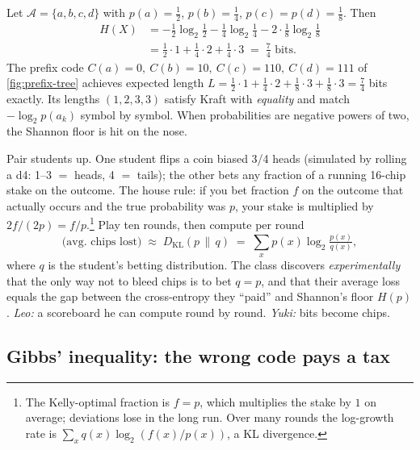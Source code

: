 \begin{example}
\label{ex:h4}
Let $\mathcal{A} = \{a, b, c, d\}$ with $p(a) = \tfrac{1}{2}$,
$p(b) = \tfrac{1}{4}$, $p(c) = p(d) = \tfrac{1}{8}$. Then
\begin{align*}
  H(X) &= -\tfrac{1}{2}\log_2\tfrac{1}{2}
         - \tfrac{1}{4}\log_2\tfrac{1}{4}
         - 2\cdot\tfrac{1}{8}\log_2\tfrac{1}{8} \\
       &= \tfrac{1}{2}\cdot 1 + \tfrac{1}{4}\cdot 2 + \tfrac{1}{4}\cdot 3
        \;=\; \tfrac{7}{4} \text{ bits}.
\end{align*}
The prefix code $C(a) = 0,\ C(b) = 10,\ C(c) = 110,\ C(d) = 111$ of
\cref{fig:prefix-tree} achieves expected length
$L = \tfrac12\cdot 1 + \tfrac14\cdot 2 + \tfrac18\cdot 3 + \tfrac18\cdot 3
= \tfrac74$ bits exactly. Its lengths $(1,2,3,3)$ satisfy Kraft with
\emph{equality} and match $-\log_2 p(a_k)$ symbol by symbol. When
probabilities are negative powers of two, the Shannon floor is hit on
the nose.
\end{example}

\begin{activity}
\label{act:bet}
Pair students up. One student flips a coin biased 3/4 heads
(simulated by rolling a d4: 1--3 $=$ heads, 4 $=$ tails); the other
bets any fraction of a running 16-chip stake on the outcome. The
house rule: if you bet fraction $f$ on the outcome that actually
occurs and the true probability was $p$, your stake is multiplied by
$2f/(2p) = f/p$.\footnote{The Kelly-optimal fraction is $f=p$, which
multiplies the stake by $1$ on average; deviations lose in the long
run. Over many rounds the log-growth rate is
$\sum_x q(x)\log_2(f(x)/p(x))$, a KL divergence.}
Play ten rounds, then compute per round
\[
  \text{(avg. chips lost)} \;\approx\; D_{\mathrm{KL}}(p \,\|\, q)
  \;=\; \sum_x p(x)\log_2\tfrac{p(x)}{q(x)},
\]
where $q$ is the student's betting distribution. The class discovers
\emph{experimentally} that the only way not to bleed chips is to bet
$q = p$, and that their average loss equals the gap between the
cross-entropy they ``paid'' and Shannon's floor $H(p)$.
\textit{Leo:} a scoreboard he can compute round by round.
\textit{Yuki:} bits become chips.
\end{activity}

\subsection*{Gibbs' inequality: the wrong code pays a tax}


